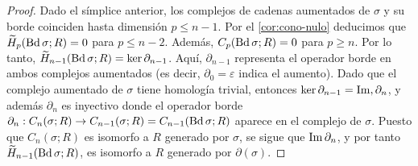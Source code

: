 \begin{proof}
	Dado el símplice anterior, los complejos de cadenas aumentados de \(\sigma\) y
	su borde coinciden hasta dimensión \(p \leq n-1\). Por el \autoref{cor:cono-nulo}
	deducimos que \(\widetilde{H}_{p}(\operatorname{Bd} \sigma; R) = 0\) para \(p \leq n-2\). Además,
	\(C_{p}(\operatorname{Bd} \sigma; R) = 0\) para \(p \geq n\). Por lo tanto, \(\widetilde{H}_{n-1}(
	\operatorname{Bd}\sigma;R)=\ker \partial_{n-1}\). Aquí, \(\partial_{n-1}\) representa el operador
	borde en ambos complejos aumentados (es decir, \(\partial_{0}=\varepsilon\) indica
	el aumento). Dado que el complejo aumentado de \(\sigma\) tiene homología trivial,
	entonces \(\ker \partial_{n-1}=\operatorname{Im}, \partial_{n}\), y además \(\partial_{n}\) es inyectivo
	donde el operador borde \(\partial_{n}: C_{n}(\sigma; R) \rightarrow C_{n-1}(\sigma
	; R) = C_{n-1}(\operatorname{Bd} \sigma; R)\) aparece en el complejo de \(\sigma\). Puesto que
	\(C_{n}(\sigma;R)\) es isomorfo a \(R\) generado por \(\sigma\), se sigue que \(\operatorname{Im} \partial
	_{n}\), y por tanto \(\widetilde{H}_{n-1}(\operatorname{Bd}\sigma;R)\), es isomorfo a \(R\) generado
	por \(\partial(\sigma)\).
\end{proof}

